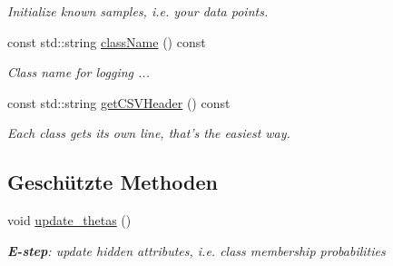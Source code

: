 \begin{DoxyCompactItemize}
\begin{DoxyCompactList}\small\item\em Initialize known samples, i.e. your data points. \item\end{DoxyCompactList}\item 
\hypertarget{classCDA_1_1CircularMixtureModel1D_a6dfd28b80e707506892f02709ccd6604}{
const std::string \hyperlink{classCDA_1_1CircularMixtureModel1D_a6dfd28b80e707506892f02709ccd6604}{className} () const }
\label{classCDA_1_1CircularMixtureModel1D_a6dfd28b80e707506892f02709ccd6604}

\begin{DoxyCompactList}\small\item\em Class name for logging ... \item\end{DoxyCompactList}\item 
\hypertarget{classCDA_1_1CircularMixtureModel1D_a873461378d347c8c7da44d6d403613e4}{
const std::string \hyperlink{classCDA_1_1CircularMixtureModel1D_a873461378d347c8c7da44d6d403613e4}{getCSVHeader} () const }
\label{classCDA_1_1CircularMixtureModel1D_a873461378d347c8c7da44d6d403613e4}

\begin{DoxyCompactList}\small\item\em Each class gets its own line, that's the easiest way. \item\end{DoxyCompactList}\end{DoxyCompactItemize}
\subsection*{Geschützte Methoden}
\begin{DoxyCompactItemize}
\item 
\hypertarget{classCDA_1_1CircularMixtureModel1D_acbbb280523436bb1231bc111fcc95bac}{
void \hyperlink{classCDA_1_1CircularMixtureModel1D_acbbb280523436bb1231bc111fcc95bac}{update\_\-thetas} ()}
\label{classCDA_1_1CircularMixtureModel1D_acbbb280523436bb1231bc111fcc95bac}

\begin{DoxyCompactList}\small\item\em {\bfseries E-\/step}: update hidden attributes, i.e. class membership probabilities \item\end{DoxyCompactList}\end{DoxyCompactItemize}



